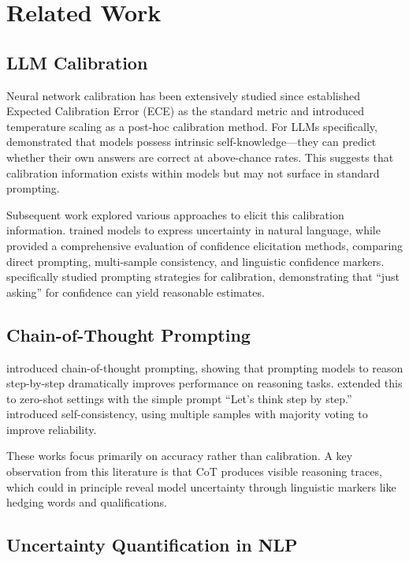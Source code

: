 \section{Related Work}

\subsection{LLM Calibration}

Neural network calibration has been extensively studied since \citet{guo2017calibration} established Expected Calibration Error (ECE) as the standard metric and introduced temperature scaling as a post-hoc calibration method. For LLMs specifically, \citet{kadavath2022language} demonstrated that models possess intrinsic self-knowledge---they can predict whether their own answers are correct at above-chance rates. This suggests that calibration information exists within models but may not surface in standard prompting.

Subsequent work explored various approaches to elicit this calibration information. \citet{lin2022teaching} trained models to express uncertainty in natural language, while \citet{xiong2023can} provided a comprehensive evaluation of confidence elicitation methods, comparing direct prompting, multi-sample consistency, and linguistic confidence markers. \citet{tian2023just} specifically studied prompting strategies for calibration, demonstrating that ``just asking'' for confidence can yield reasonable estimates.

\subsection{Chain-of-Thought Prompting}

\citet{wei2022chain} introduced chain-of-thought prompting, showing that prompting models to reason step-by-step dramatically improves performance on reasoning tasks. \citet{kojima2022large} extended this to zero-shot settings with the simple prompt ``Let's think step by step.'' \citet{wang2023selfconsistency} introduced self-consistency, using multiple samples with majority voting to improve reliability.

These works focus primarily on accuracy rather than calibration. A key observation from this literature is that CoT produces visible reasoning traces, which could in principle reveal model uncertainty through linguistic markers like hedging words and qualifications.

\subsection{Uncertainty Quantification in NLP}

